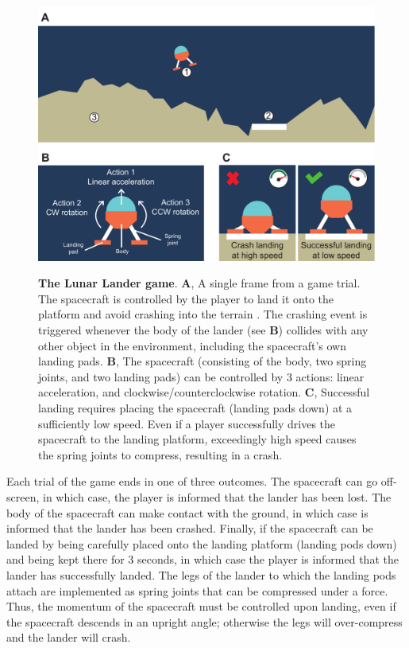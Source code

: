 \begin{figure}[bth]
    \centering
    {\includegraphics[width=\linewidth]{Figures/c5/ll_ss.pdf}}
    \caption[short figure description]{\textbf{The Lunar Lander game}. \textbf{A}, A single frame from a game trial. The spacecraft  is controlled by the player to land it onto the platform  and avoid crashing into the terrain . The crashing event is triggered whenever the body of the lander (see \textbf{B}) collides with any other object in the environment, including the spacecraft's own landing pads. \textbf{B}, The spacecraft (consisting of the body, two spring joints, and two landing pads) can be controlled by 3 actions: linear acceleration, and clockwise/counterclockwise rotation. \textbf{C}, Successful landing requires placing the spacecraft (landing pads down) at a sufficiently low speed. Even if a player successfully drives the spacecraft to the landing platform, exceedingly high speed causes the spring joints to compress, resulting in a crash.}\label{fig:5-ll_ss}
\end{figure}

Each trial of the game ends in one of three outcomes. The spacecraft can go off-screen, in which case, the player is informed that the lander has been lost. The body of the spacecraft can make contact with the ground, in which case is informed that the lander has been crashed. Finally, if the spacecraft can be landed by being carefully placed onto the landing platform (landing pods down) and being kept there for 3 seconds, in which case the player is informed that the lander has successfully landed. The legs of the lander to which the landing pods attach are implemented as spring joints that can be compressed under a force. Thus, the momentum of the spacecraft must be controlled upon landing, even if the spacecraft descends in an upright angle; otherwise the legs will over-compress and the lander will crash.

